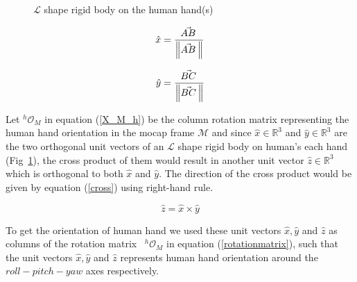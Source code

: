 \begin{figure}[ht]
	\caption{$\mathcal{L}$ shape rigid body on the human hand(s)}
	\label{fig:lshapes}
\end{figure}

\begin{equation*}
\hat{x} = \frac{\vec{AB}^{\,}}{\norm{\vec{AB}^{\,}}}
\end{equation*}

\begin{equation*}
\hat{y} = \frac{\vec{BC}^{\,}}{\norm{\vec{BC}^{\,}}}
\end{equation*}


Let ${}^{h}\mathcal{O}_{M}$ in equation (\ref{X_M_h}) be the column rotation matrix representing the human hand orientation in the mocap frame $\mathcal{M}$ and since $\hat{x} \in \mathbb{R}^{3}$ and $\hat{y} \in \mathbb{R}^{3}$ are the two orthogonal unit vectors of an $\mathcal{L}$ shape rigid body on human's each hand (Fig~\ref{fig:lshapes}), the cross product of them would result in another unit vector $\hat{z} \in \mathbb{R}^{3}$ which is orthogonal to both $\hat{x}$ and $\hat{y}$. The direction of the cross product would be given by equation (\ref{cross}) using right-hand rule.


\begin{equation}\label{cross}
\hat{z} = \hat{x} \times \hat{y}
\end{equation}



To get the orientation of human hand we used these unit vectors $\hat{x}, \hat{y}$ and $\hat{z}$ as columns of the rotation matrix~\cite{evans2001rotations, altmann2005rotations, jia2017rotation} ${}^{h}\mathcal{O}_{M}$ in equation (\ref{rotationmatrix}), such that the unit vectors $\hat{x}, \hat{y}$ and $\hat{z}$ represents human hand orientation around the $roll-pitch-yaw$ axes respectively.

